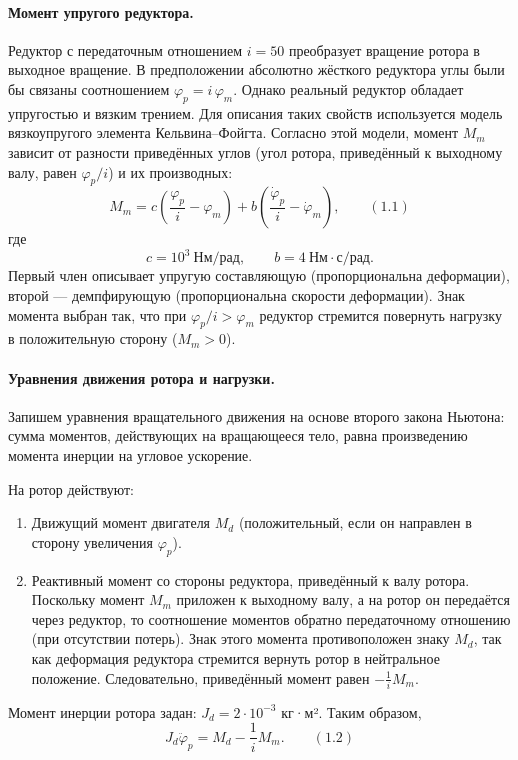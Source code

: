 \documentclass[a4paper, 14pt]{extarticle}
\begin{document}
\paragraph{Момент упругого редуктора.}
Редуктор с передаточным отношением \(i = 50\) преобразует вращение ротора в выходное вращение. В предположении абсолютно жёсткого редуктора углы были бы связаны соотношением \(\varphi_p = i\,\varphi_m\). Однако реальный редуктор обладает упругостью и вязким трением. Для описания таких свойств используется модель вязкоупругого элемента Кельвина–Фойгта. Согласно этой модели, момент \(M_m\) зависит от разности приведённых углов (угол ротора, приведённый к выходному валу, равен \(\varphi_p/i\)) и их производных:
\[
    M_m = c\left(\frac{\varphi_p}{i} - \varphi_m\right) + b\left(\frac{\dot{\varphi}_p}{i} - \dot{\varphi}_m\right),
    \qquad (1.1)
\]
где
\[
    c = 10^3\ \text{Нм/рад},\qquad
    b = 4\ \text{Нм}\cdot\text{с/рад}.
\]
Первый член описывает упругую составляющую (пропорциональна деформации), второй — демпфирующую (пропорциональна скорости деформации). Знак момента выбран так, что при \(\varphi_p/i > \varphi_m\) редуктор стремится повернуть нагрузку в положительную сторону (\(M_m > 0\)).

\paragraph{Уравнения движения ротора и нагрузки.}
Запишем уравнения вращательного движения на основе второго закона Ньютона: сумма моментов, действующих на вращающееся тело, равна произведению момента инерции на угловое ускорение.

На ротор действуют:
\begin{enumerate}
    \item Движущий момент двигателя \(M_d\) (положительный, если он направлен в сторону увеличения \(\varphi_p\)).
    \item Реактивный момент со стороны редуктора, приведённый к валу ротора. Поскольку момент \(M_m\) приложен к выходному валу, а на ротор он передаётся через редуктор, то соотношение моментов обратно передаточному отношению (при отсутствии потерь). Знак этого момента противоположен знаку \(M_d\), так как деформация редуктора стремится вернуть ротор в нейтральное положение. Следовательно, приведённый момент равен \(-\frac{1}{i} M_m\).
\end{enumerate}
Момент инерции ротора задан: \(J_d = 2\cdot10^{-3}\) кг·м². Таким образом,
\[
    J_d \ddot{\varphi}_p = M_d - \frac{1}{i} M_m. \qquad (1.2)
\]
\end{document}
